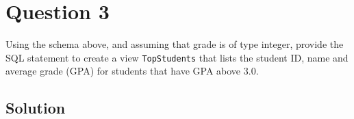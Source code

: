 
\section*{Question 3}

Using the schema above, and assuming that grade is of type integer, provide the SQL statement to create a view \texttt{TopStudents} that lists the student ID, name and average grade (GPA) for students that have GPA above 3.0.

\subsection*{Solution}

\lstset{language=sql}

